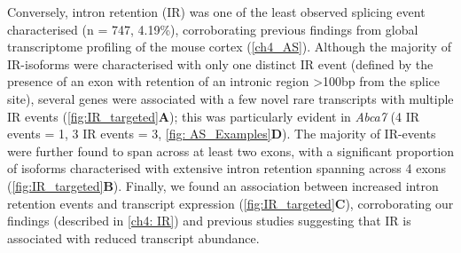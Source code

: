 \newpage
Conversely, intron retention (IR) was one of the least observed splicing event characterised (n = 747, 4.19\%), corroborating previous findings from global transcriptome profiling of the mouse cortex (\cref{ch4_AS}). Although the majority of IR-isoforms were characterised with only one distinct IR event (defined by the presence of an exon with retention of an intronic region >100bp from the splice site), several genes were associated with a few novel rare transcripts with multiple IR events (\cref{fig:IR_targeted}\textbf{A}); this was particularly evident in \textit{Abca7} (4 IR events = 1, 3 IR events = 3, \cref{fig: AS_Examples}\textbf{D}). The majority of IR-events were further found to span across at least two exons, with a significant proportion of isoforms characterised with extensive intron retention spanning across 4 exons (\cref{fig:IR_targeted}\textbf{B}). Finally, we found an association between increased intron retention events and transcript expression (\cref{fig:IR_targeted}\textbf{C}), corroborating our findings (described in \cref{ch4: IR}) and previous studies\cite{Braunschweig2014} suggesting that IR is associated with reduced transcript abundance.

